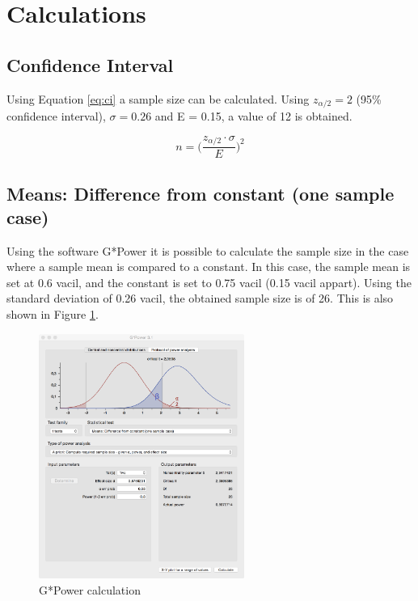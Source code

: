 \documentclass[a4paper]{article}
\begin{document}

\section{Calculations} %
\label{sec:calculations}

\subsection{Confidence Interval} %
\label{sub:confidence_interval}

Using Equation \ref{eq:ci} a sample size can be calculated. Using
$z_{\alpha/2} = 2$ (95\% confidence interval), $\sigma = 0.26$  and E = 0.15,
a value of 12 is obtained.

\begin{equation}
  n = \Big( \frac{z_{\alpha/2} \cdot \sigma}{E} \Big)^2
  \label{eq:ci}
\end{equation}


\subsection{Means: Difference from constant (one sample case)} %
\label{sub:means_difference_from_constant_}

Using the software G*Power it is possible to calculate the sample size in the
case where a sample mean is compared to a constant. In this case, the sample
mean is set at 0.6 vacil, and the constant is set to 0.75 vacil (0.15 vacil
appart). Using the standard deviation of 0.26 vacil, the obtained sample size
is of 26. This is also shown in Figure \ref{fig:gpower}.

\begin{figure}[ht!]
    \centering
    \includegraphics[height=8cm]
        {img/g-power_means}
    \caption{G*Power calculation}
    \label{fig:gpower}
\end{figure}



\custombibliography
\end{document}
